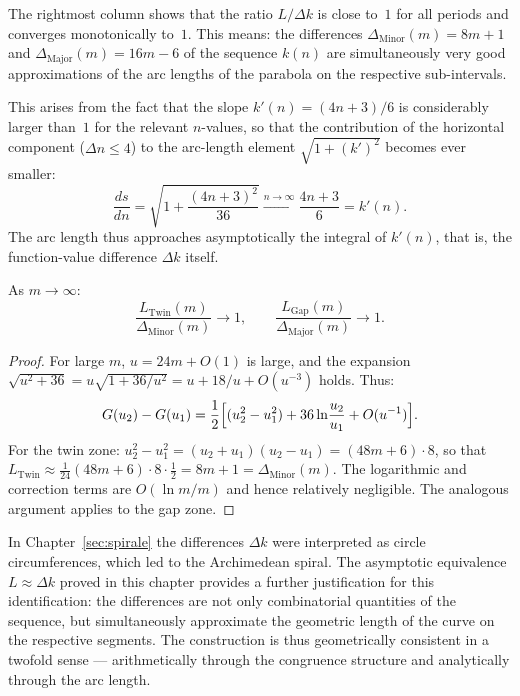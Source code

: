 \begin{tcolorbox}[
  title={Main observation: arc length $\approx$ difference value},
  colback=blue!3,
  colframe=blue!40!black,
  enhanced,
  breakable
]
The rightmost column shows that the ratio $L / \Delta k$ is close to~$1$
for all periods and converges monotonically to~$1$. This means: the
differences $\Delta_{\mathrm{Minor}}(m) = 8m+1$ and
$\Delta_{\mathrm{Major}}(m) = 16m-6$ of the sequence $k(n)$ are
simultaneously very good approximations of the arc lengths of the parabola
on the respective sub-intervals.

This arises from the fact that the slope $k'(n) = (4n+3)/6$ is considerably
larger than~$1$ for the relevant $n$-values, so that the contribution of the
horizontal component ($\Delta n \leq 4$) to the arc-length element
$\sqrt{1+(k')^2}$ becomes ever smaller:
\[
  \frac{ds}{dn} = \sqrt{1 + \frac{(4n+3)^2}{36}}
  \xrightarrow{n \to \infty} \frac{4n+3}{6} = k'(n).
\]
The arc length thus approaches asymptotically the integral of $k'(n)$,
that is, the function-value difference $\Delta k$ itself.
\end{tcolorbox}

\begin{proposition}
\label{prop:bl_aequivalenz}
As $m \to \infty$:
\[
  \frac{L_{\mathrm{Twin}}(m)}{\Delta_{\mathrm{Minor}}(m)} \to 1,
  \qquad
  \frac{L_{\mathrm{Gap}}(m)}{\Delta_{\mathrm{Major}}(m)} \to 1.
\]
\end{proposition}

\begin{proof}
For large $m$, $u = 24m + O(1)$ is large, and the expansion
$\sqrt{u^2+36} = u\sqrt{1+36/u^2} = u + 18/u + O(u^{-3})$ holds. Thus:
\[
  G(u_2) - G(u_1)
  = \frac{1}{2}\Bigl[(u_2^2 - u_1^2)
    + 36\ln\!\frac{u_2}{u_1}
    + O(u^{-1})\Bigr].
\]
For the twin zone: $u_2^2 - u_1^2 = (u_2+u_1)(u_2-u_1) = (48m+6)\cdot 8$,
so that $L_{\mathrm{Twin}} \approx \frac{1}{24}(48m+6)\cdot 8 \cdot \frac{1}{2}
= 8m + 1 = \Delta_{\mathrm{Minor}}(m)$.
The logarithmic and correction terms are $O(\ln m / m)$ and hence
relatively negligible. The analogous argument applies to the gap zone.
\end{proof}

\begin{remark}
In Chapter~\ref{sec:spirale} the differences $\Delta k$ were interpreted as
circle circumferences, which led to the Archimedean spiral. The asymptotic
equivalence $L \approx \Delta k$ proved in this chapter provides a
further justification for this identification: the differences are
not only combinatorial quantities of the sequence, but
simultaneously approximate the geometric length of the curve on the
respective segments. The construction is thus geometrically consistent
in a twofold sense --- arithmetically through the congruence structure
and analytically through the arc length.
\end{remark}
